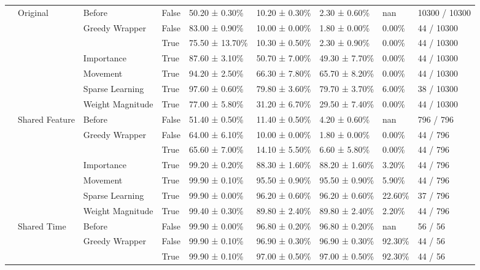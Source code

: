 \begin{tabular}{lllllllll}
\cline{2-9} \cline{3-9}
 & \multirow[t]{7}{*}{Original} & Before & False & 50.20 ± 0.30\% & 10.20 ± 0.30\% & 2.30 ± 0.60\% & nan & 10300 / 10300 \\
\cline{3-9}
 &  & \multirow[t]{2}{*}{Greedy Wrapper} & False & 83.00 ± 0.90\% & 10.00 ± 0.00\% & 1.80 ± 0.00\% & 0.00\% & 44 / 10300 \\
 &  &  & True & 75.50 ± 13.70\% & 10.30 ± 0.50\% & 2.30 ± 0.90\% & 0.00\% & 44 / 10300 \\
\cline{3-9}
 &  & Importance & True & 87.60 ± 3.10\% & 50.70 ± 7.00\% & 49.30 ± 7.70\% & 0.00\% & 44 / 10300 \\
\cline{3-9}
 &  & Movement & True & 94.20 ± 2.50\% & 66.30 ± 7.80\% & 65.70 ± 8.20\% & 0.00\% & 44 / 10300 \\
\cline{3-9}
 &  & Sparse Learning & True & 97.60 ± 0.60\% & 79.80 ± 3.60\% & 79.70 ± 3.70\% & 6.00\% & 38 / 10300 \\
\cline{3-9}
 &  & Weight Magnitude & True & 77.00 ± 5.80\% & 31.20 ± 6.70\% & 29.50 ± 7.40\% & 0.00\% & 44 / 10300 \\
\cline{2-9} \cline{3-9}
 & \multirow[t]{7}{*}{Shared Feature} & Before & False & 51.40 ± 0.50\% & 11.40 ± 0.50\% & 4.20 ± 0.60\% & nan & 796 / 796 \\
\cline{3-9}
 &  & \multirow[t]{2}{*}{Greedy Wrapper} & False & 64.00 ± 6.10\% & 10.00 ± 0.00\% & 1.80 ± 0.00\% & 0.00\% & 44 / 796 \\
 &  &  & True & 65.60 ± 7.00\% & 14.10 ± 5.50\% & 6.60 ± 5.80\% & 0.00\% & 44 / 796 \\
\cline{3-9}
 &  & Importance & True & 99.20 ± 0.20\% & 88.30 ± 1.60\% & 88.20 ± 1.60\% & 3.20\% & 44 / 796 \\
\cline{3-9}
 &  & Movement & True & 99.90 ± 0.10\% & 95.50 ± 0.90\% & 95.50 ± 0.90\% & 5.90\% & 44 / 796 \\
\cline{3-9}
 &  & Sparse Learning & True & 99.90 ± 0.00\% & 96.20 ± 0.60\% & 96.20 ± 0.60\% & 22.60\% & 37 / 796 \\
\cline{3-9}
 &  & Weight Magnitude & True & 99.40 ± 0.30\% & 89.80 ± 2.40\% & 89.80 ± 2.40\% & 2.20\% & 44 / 796 \\
\cline{2-9} \cline{3-9}
 & \multirow[t]{7}{*}{Shared Time} & Before & False & 99.90 ± 0.00\% & 96.80 ± 0.20\% & 96.80 ± 0.20\% & nan & 56 / 56 \\
\cline{3-9}
 &  & \multirow[t]{2}{*}{Greedy Wrapper} & False & 99.90 ± 0.10\% & 96.90 ± 0.30\% & 96.90 ± 0.30\% & 92.30\% & 44 / 56 \\
 &  &  & True & 99.90 ± 0.10\% & 97.00 ± 0.50\% & 97.00 ± 0.50\% & 92.30\% & 44 / 56 \\

\end{tabular}

